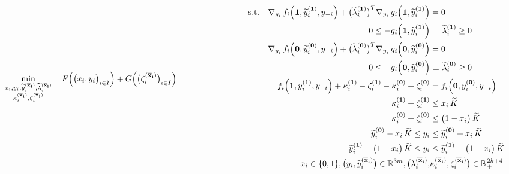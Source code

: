\documentclass[9pt,a4paper]{article}
\newcommand{\st}{\text{s.t.} \quad}
\newcommand{\upfixedx}{^{\mathbf{(\overline{x}_i)}}}
\newcommand{\one}{\mathbf{1}}
\newcommand{\zero}{\mathbf{0}}
\newcommand{\upone}{^{\mathbf{(1)}}}
\newcommand{\upzero}{^{\mathbf{(0)}}}
\begin{document}
\setcounter{equation}{13}
\begin{subequations} \label{model:overall:problem}
\begin{align}
\min_{
\substack{x_i,y_i,
\widetilde{y}\upfixedx_i,\widetilde{\lambda}\upfixedx_i \\  \kappa\upfixedx_i,\zeta\upfixedx_i}}
\quad F\Big(\big(x_i,y_i\big)_{i \in I}\Big) + G\Big(\big(\zeta\upfixedx_i\big)_{i \in I}\Big) \hspace{3 cm} \label{model:overall:problem:objective}
\end{align}
\vspace{-0.5 cm}\begin{align}
\st \nabla_{y_i} \, f_i\Big(\one,\widetilde{y}_i\upone,y_{-i}\Big) + \big(\widetilde{\lambda}_i\upone\big)^T \nabla_{y_i} \, g_i\Big(\one,\widetilde{y}_i\upone\Big) &= 0 \label{model:overall:problem:KKT:1}\\
%
0 \leq - g_i\Big(\one,\widetilde{y}_i\upone \Big)& \ \bot \ \widetilde{\lambda}_i\upone \geq 0 \label{model:overall:problem:KKT:constraints:1} \\
\nabla_{y_i} \, f_i\Big(\zero,\widetilde{y}_i\upzero,y_{-i}\Big) + \big(\widetilde{\lambda}_i\upzero\big)^T \nabla_{y_i} \, g_i\Big(\zero,\widetilde{y}_i\upzero\Big) &= 0 \label{model:overall:problem:KKT:0}\\
%
0 \leq - g_i\Big(\zero,\widetilde{y}_i\upzero \Big)& \ \bot \ \widetilde{\lambda}_i\upzero \geq 0 \label{model:overall:problem:KKT:constraints:0} \\
f_i\Big(\one,y_i\upone,y_{-i}\Big) + \kappa_i\upone - \zeta_i\upone - \kappa_i\upzero + \zeta_i\upzero&= f_i\Big(\zero,y_i\upzero,y_{-i}\Big) \label{model:overall:problem:incentive} \\
\kappa_i\upone + \zeta_i\upone&\leq  x_i \, \widetilde{K}  \label{model:overall:problem:duals1} \\
\kappa_i\upzero + \zeta_i\upzero&\leq \big(1-x_i\big) \, \widetilde{K}  \label{model:overall:problem:duals0} \\
\widetilde{y}_i\upzero - x_i \, \widetilde{K} \leq y_i &\leq \widetilde{y}_i\upzero + x_i \, \widetilde{K}  \label{model:overall:problem:translate0} \\
\widetilde{y}_i\upone - \big(1-x_i \big) \, \widetilde{K} \leq
y_i &\leq \widetilde{y}_i\upone + \big(1-x_i \big) \, \widetilde{K} \label{model:overall:problem:translate1} \\
x_i \in \{0,1\}, \big(y_i,\widetilde{y}_i\upfixedx \big) \in \mathbb{R}^{3m}, \big(\lambda_i\upfixedx, 
& \kappa_i\upfixedx,\zeta_i\upfixedx\big) \in \mathbb{R}_+^{2k+4}
 \nonumber
\end{align}
\end{subequations}
\end{document}
